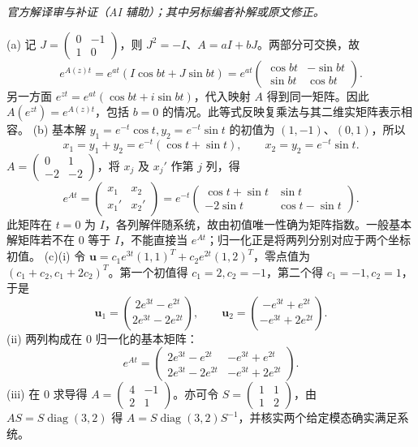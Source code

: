\begin{solution}
\textit{官方解译审与补证（AI 辅助）；其中另标编者补解或原文修正。}\par

(a) 记 $J=\begin{pmatrix}0&-1\\1&0\end{pmatrix}$，则 $J^2=-I$、$A=aI+bJ$。两部分可交换，故
\[e^{A(z)t}=e^{at}(I\cos bt+J\sin bt)=e^{at}\begin{pmatrix}\cos bt&-\sin bt\\\sin bt&\cos bt\end{pmatrix}.\]
另一方面 $e^{zt}=e^{at}(\cos bt+i\sin bt)$，代入映射 $A$ 得到同一矩阵。因此 $A(e^{zt})=e^{A(z)t}$，包括 $b=0$ 的情况。此等式反映复乘法与其二维实矩阵表示相容。
(b) 基本解 $y_1=e^{-t}\cos t,y_2=e^{-t}\sin t$ 的初值为 $(1,-1)$、$(0,1)$，所以
\[x_1=y_1+y_2=e^{-t}(\cos t+\sin t),\qquad x_2=y_2=e^{-t}\sin t.\]
$A=\begin{pmatrix}0&1\\-2&-2\end{pmatrix}$，将 $x_j$ 及 $x_j'$ 作第 $j$ 列，得
\[e^{At}=\begin{pmatrix}x_1&x_2\\x_1'&x_2'\end{pmatrix}=e^{-t}\begin{pmatrix}\cos t+\sin t&\sin t\\-2\sin t&\cos t-\sin t\end{pmatrix}.\]
此矩阵在 $t=0$ 为 $I$，各列解伴随系统，故由初值唯一性确为矩阵指数。一般基本解矩阵若不在 $0$ 等于 $I$，不能直接当 $e^{At}$；归一化正是将两列分别对应于两个坐标初值。
(c)(i) 令 $\mathbf u=c_1e^{3t}(1,1)^T+c_2e^{2t}(1,2)^T$，零点值为 $(c_1+c_2,c_1+2c_2)^T$。第一个初值得 $c_1=2,c_2=-1$，第二个得 $c_1=-1,c_2=1$，于是
\[\mathbf u_1=\binom{2e^{3t}-e^{2t}}{2e^{3t}-2e^{2t}},\qquad\mathbf u_2=\binom{-e^{3t}+e^{2t}}{-e^{3t}+2e^{2t}}.\]
(ii) 两列构成在 $0$ 归一化的基本矩阵：
\[e^{At}=\begin{pmatrix}2e^{3t}-e^{2t}&-e^{3t}+e^{2t}\\2e^{3t}-2e^{2t}&-e^{3t}+2e^{2t}\end{pmatrix}.\]
(iii) 在 $0$ 求导得 $A=\begin{pmatrix}4&-1\\2&1\end{pmatrix}$。亦可令 $S=\begin{pmatrix}1&1\\1&2\end{pmatrix}$，由 $AS=S\operatorname{diag}(3,2)$ 得 $A=S\operatorname{diag}(3,2)S^{-1}$，并核实两个给定模态确实满足系统。
\end{solution}
